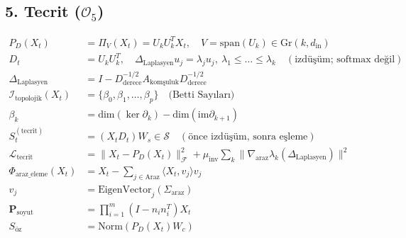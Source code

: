 \documentclass[11pt, a4paper]{article}
\begin{document}
\subsection{5. Tecrit ($\mathcal{O}_5$)}
\begin{align}
P_D(X_t) &= \Pi_V(X_t) = U_k U_k^T X_t, \quad V = \text{span}(U_k) \in \text{Gr}(k, d_{\text{in}}) \\
D_t &= U_k U_k^T, \quad \Delta_{\text{Laplasyen}} u_j = \lambda_j u_j, \ \lambda_1 \le \dots \le \lambda_k \quad (\text{izdüşüm; softmax değil}) \\
\Delta_{\text{Laplasyen}} &= I - D_{\text{derece}}^{-1/2} A_{\text{komşuluk}} D_{\text{derece}}^{-1/2} \\
\mathcal{I}_{\text{topolojik}}(X_t) &= \{ \beta_0, \beta_1, \dots, \beta_p \} \quad \text{(Betti Sayıları)} \\
\beta_k &= \text{dim}(\ker \partial_k) - \text{dim}(\text{im} \partial_{k+1}) \\
S_t^{(\text{tecrit})} &= (X_t D_t) W_s \in \mathcal{S} \quad (\text{önce izdüşüm, sonra eşleme}) \\
\mathcal{L}_{\text{tecrit}} &= \| X_t - P_D(X_t) \|_{\mathcal{F}}^2 + \mu_{\text{inv}} \sum_k \|\nabla_{\text{araz}} \lambda_k(\Delta_{\text{Laplasyen}})\|^2 \\
\Phi_{\text{araz\_eleme}}(X_t) &= X_t - \sum_{j \in \text{Araz}} \langle X_t, v_j \rangle v_j \\
v_j &= \text{EigenVector}_j(\Sigma_{\text{araz}}) \\
\mathbf{P}_{\text{soyut}} &= \prod_{i=1}^m (I - n_i n_i^T) X_t \\
S_{\text{öz}} &= \text{Norm}(P_D(X_t) W_c)
\end{align}
\end{document}

